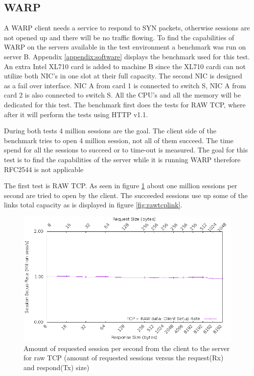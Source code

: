\newpage

\subsection{WARP}\label{sub:warp}

A WARP client needs a service to respond to SYN packets, otherwise sessions are not opened up and there will be no traffic flowing. 
To find the capabilities of WARP on the servers available in the test environment a benchmark was run on server B. 
Appendix \ref{appendix:software} displays the benchmark used for this test. 
An extra Intel XL710 card is added to machine B since the XL710 cardi can not utilize both NIC's in one slot at their full capacity.
The second NIC is designed as a fail over interface. 
NIC A from card 1 is connected to switch S, NIC A from card 2 is also connected to switch S. 
All the CPU's and all the memory will be dedicated for this test. 
The benchmark first does the tests for RAW TCP, where after it will perform the tests using HTTP v1.1.

During both tests 4 million sessions are the goal.
The client side of the benchmark tries to open 4 million session, not all of them succeed. The time spend for all the sessions to succeed or to time-out is measured.
The goal for this test is to find the capabilities of the server while it is running WARP therefore RFC2544 is not applicable 

The first test is RAW TCP. As seen in figure \ref{fig:rawtcpsession} about one million sessions per second are tried to open by the client.
The succeeded sessions use up some of the links total capacity as is displayed in figure \ref{fig:rawtcplink}.  

\begin{figure}[H]
  \includegraphics[scale=0.6]{images/raw_setup.png}
  \caption{Amount of requested session per second from the client to the server for raw TCP (amount of requested sessions versus the request(Rx) and respond(Tx) size)}
  \label{fig:rawtcpsession}
\end{figure}

